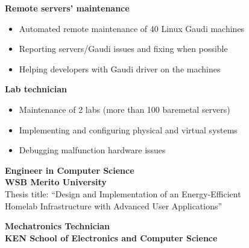 \documentclass[10pt,a4paper,ragged2e,withhyper]{altacv/altacv}
\begin{document}
\begin{paracol}{2}
\textbf{\textcolor{accent}{Remote servers’ maintenance}} \hfill {}
\smallskip

\begin{itemize}
\item Automated remote maintenance of 40 Linux Gaudi machines
\item Reporting servers/Gaudi issues and fixing when possible
\item Helping developers with Gaudi driver on the machines
\end{itemize}

\medskip

\textbf{\textcolor{accent}{Lab technician}} \hfill {}
\smallskip

\begin{itemize}
\item Maintenance of 2 labs (more than 100 baremetal servers)
\item Implementing and configuring physical and virtual systems
\item Debugging malfunction hardware issues
\end{itemize}





\medskip


\large\textbf{Engineer in Computer Science} \normalsize \hfill {}\\
\textbf{\textcolor{accent}{WSB Merito University}} \hfill {}\\
\smallskip
Thesis title: “Design and Implementation of an Energy-Efficient\\Homelab Infrastructure with Advanced User Applications”

\divider

\large\textbf{Mechatronics Technician} \normalsize \hfill {}\\
\textbf{\textcolor{accent}{KEN School of Electronics and Computer Science}} \hfill {}\\
\smallskip



\end{paracol}
\end{document}
